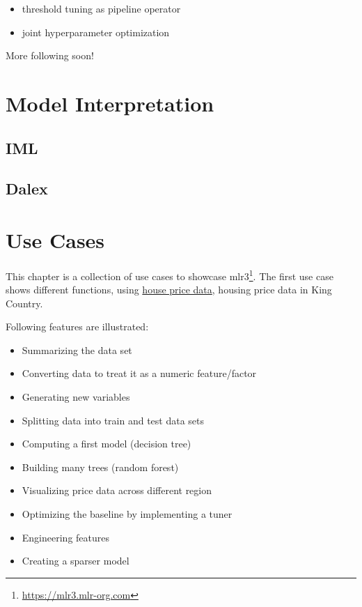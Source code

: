 \documentclass[12pt,]{scrbook}
\providecommand{\tightlist}{%
  \setlength{\itemsep}{0pt}\setlength{\parskip}{0pt}}
\renewcommand{\href}[2]{#2\footnote{\url{#1}}}
\begin{document}
\begin{itemize}
\tightlist
\item
  threshold tuning as pipeline operator
\item
  joint hyperparameter optimization
\end{itemize}

More following soon!

\hypertarget{interpretation}{%
\chapter{Model Interpretation}\label{interpretation}}

\hypertarget{iml}{%
\section{IML}\label{iml}}

\hypertarget{dalex}{%
\section{Dalex}\label{dalex}}

\hypertarget{use-cases}{%
\chapter{Use Cases}\label{use-cases}}

This chapter is a collection of use cases to showcase \href{https://mlr3.mlr-org.com}{mlr3}.
The first use case shows different functions, using \protect\hyperlink{use-case-regr-houses}{house price data}, housing price data in King Country.

Following features are illustrated:

\begin{itemize}
\tightlist
\item
  Summarizing the data set
\item
  Converting data to treat it as a numeric feature/factor
\item
  Generating new variables
\item
  Splitting data into train and test data sets
\item
  Computing a first model (decision tree)
\item
  Building many trees (random forest)
\item
  Visualizing price data across different region
\item
  Optimizing the baseline by implementing a tuner
\item
  Engineering features
\item
  Creating a sparser model
\end{itemize}
\end{document}
